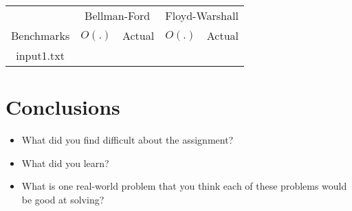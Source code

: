 \documentclass[twocolumn]{article}
\begin{document}
\begin{table}
    \begin{tabular}{|c|c|c|c|c|}
        \hline
        &\multicolumn{2}{|c|}{Bellman-Ford}&\multicolumn{2}{|c|}{Floyd-Warshall}\\
        \cline{2-5}
        Benchmarks&$O(.)$&Actual&$O(.)$&Actual\\
        \hline
        input1.txt&      &      &      &      \\
        \hline
    \end{tabular}
\end{table}

\section{Conclusions}
\begin{itemize}
    \item What did you find difficult about the assignment?
    \item What did you learn?
    \item What is one real-world problem that you think each of these problems
    would be good at solving?
\end{itemize}
\end{document}
